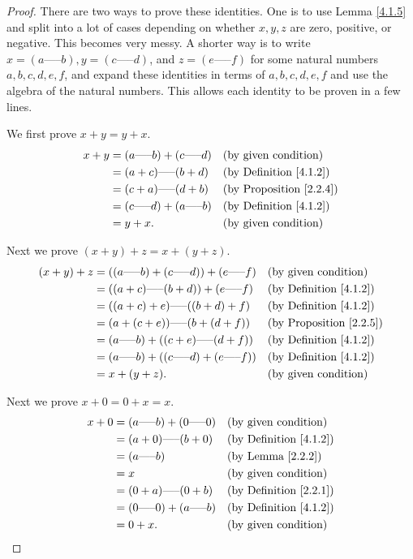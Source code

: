 \begin{proof}
There are two ways to prove these identities.
One is to use Lemma \ref{4.1.5} and split into a lot of cases depending on whether \(x, y, z\) are zero, positive, or negative.
This becomes very messy.
A shorter way is to write \(x = (a \text{-----} b), y = (c \text{-----} d)\), and \(z = (e \text{-----} f)\) for some natural numbers \(a, b, c, d, e, f\), and expand these identities in terms of \(a, b, c, d, e, f\) and use the algebra of the natural numbers.
This allows each identity to be proven in a few lines.

We first prove \(x + y = y + x\).
\begin{align*}
x + y &= (a \text{-----} b) + (c \text{-----} d) && \text{(by given condition)} \\
&= (a + c) \text{-----} (b + d) && \text{(by Definition \ref{4.1.2})} \\
&= (c + a) \text{-----} (d + b) && \text{(by Proposition \ref{2.2.4})} \\
&= (c \text{-----} d) + (a \text{-----} b) && \text{(by Definition \ref{4.1.2})} \\
&= y + x. && \text{(by given condition)}
\end{align*}

Next we prove \((x + y) + z = x + (y + z)\).
\begin{align*}
(x + y) + z &= ((a \text{-----} b) + (c \text{-----} d)) + (e \text{-----} f) && \text{(by given condition)} \\
&= ((a + c) \text{-----} (b + d)) + (e \text{-----} f) && \text{(by Definition \ref{4.1.2})} \\
&= ((a + c) + e) \text{-----} ((b + d) + f) && \text{(by Definition \ref{4.1.2})} \\
&= (a + (c + e)) \text{-----} (b + (d + f)) && \text{(by Proposition \ref{2.2.5})} \\
&= (a \text{-----} b) + ((c + e) \text{-----} (d + f)) && \text{(by Definition \ref{4.1.2})} \\
&= (a \text{-----} b) + ((c \text{-----} d) + (e \text{-----} f)) && \text{(by Definition \ref{4.1.2})} \\
&= x + (y + z). && \text{(by given condition)}
\end{align*}

Next we prove \(x + 0 = 0 + x = x\).
\begin{align*}
x + 0 &= (a \text{-----} b) + (0 \text{-----} 0) && \text{(by given condition)} \\
&= (a + 0) \text{-----} (b + 0) && \text{(by Definition \ref{4.1.2})} \\
&= (a \text{-----} b) && \text{(by Lemma \ref{2.2.2})} \\
&= x && \text{(by given condition)} \\
&= (0 + a) \text{-----} (0 + b) && \text{(by Definition \ref{2.2.1})} \\
&= (0 \text{-----} 0) + (a \text{-----} b) && \text{(by Definition \ref{4.1.2})} \\
&= 0 + x. && \text{(by given condition)}
\end{align*}


\end{proof}
